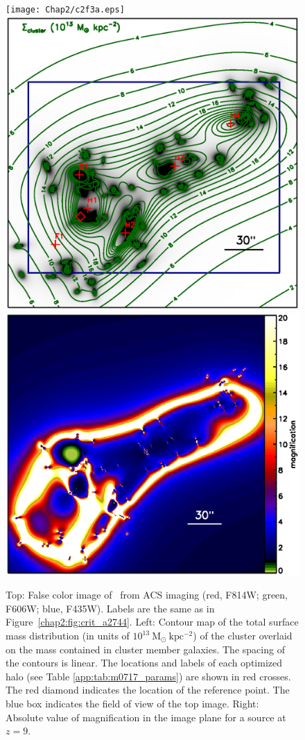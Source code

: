 \begin{figure}[h]
\centering
\texttt{[image: Chap2/c2f3a.eps]} \\
\includegraphics[height=0.28\textheight]{Chap2/c2f3b.eps}
\includegraphics[height=0.28\textheight]{Chap2/c2f3c.eps}
\caption[\MACSzeroseven\ image constraints and critical curves]{Top: False color image of \MACSzeroseven\ from ACS imaging (red, F814W; green, F606W; blue, F435W). Labels are the same as in Figure~\ref{chap2:fig:crit_a2744}. Left: Contour map of the total surface mass distribution (in units of $10^{13}\ \mathrm{M_\odot \ kpc^{-2}}$) of the cluster overlaid on the mass contained in cluster member galaxies. The spacing of the contours is linear. The locations and labels of each optimized halo (see Table \ref{app:tab:m0717_params}) are shown in red crosses. The red diamond indicates the location of the reference point. The blue box indicates the field of view of the top image. Right: Absolute value of magnification in the image plane for a source at $z=9$.}

\end{figure}
